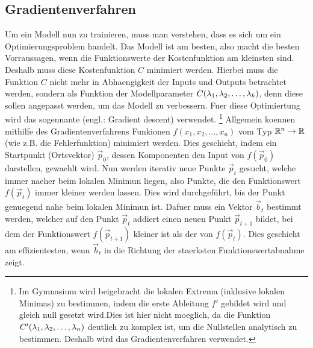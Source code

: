 \subsection{Gradientenverfahren}\label{sec:gradientenverfahren}
Um ein Modell nun zu trainieren, muss man verstehen, dass es sich um ein Optimierungsproblem handelt.
Das Modell ist am besten, also macht die besten Vorraussagen, wenn die
Funktionswerte der Kostenfunktion am kleinsten sind.
Deshalb muss diese Kostenfunktion $C$ minimiert werden.
Hierbei muss die Funktion $C$ nicht mehr in Abhaengigkeit der Inputs und Outputs betrachtet
werden, sondern als Funktion der Modellparameter
$C(\lambda_1, \lambda_2, \ldots, \lambda_k)$, denn diese sollen angepasst werden,
um das Modell zu verbessern.
Fuer diese Optimiertung wird das sogennante  (engl.: Gradient descent) verwendet.
\footnote{%
  Im Gymnasium wird beigebracht die lokalen Extrema (inklusive lokalen Minimas) zu
  bestimmen, indem die erste Ableitung $f'$ gebildet wird und gleich null gesetzt
  wird.Dies ist hier nicht moeglich, da die Funktion
  $C'(\lambda_1,\lambda_2,\ldots,\lambda_n)$ deutlich zu komplex ist, um die
  Nullstellen analytisch zu bestimmen. Deshalb wird das Gradientenverfahren
  verwendet.
}
\para{}
Allgemein koennen mithilfe des Gradientenverfahrens Funkionen $f(x_1, x_2, \ldots, x_n)$ vom Typ $\mathbb{R}^n \to \mathbb{R}$ (wie z.B. die Fehlerfunktion) minimiert werden.
Dies geschieht, indem ein Startpunkt (Ortsvektor) $\vec{p}_0$, dessen
Komponenten den Input von $f(\vec{p}_0)$ darstellen, gewaehlt wird.
Nun werden iterativ neue Punkte $\vec{p}_t$ gesucht, welche immer naeher beim lokalen Minimun liegen, also Punkte, die den Funktionswert $f(\vec{p}_t)$ immer kleiner werden lassen.
Dies wird durchgeführt, bis der Punkt genuegend nahe beim lokalen Minimun ist.
\para{}
Dafuer muss ein Vektor $\vec{b}_t$ bestimmt werden, welcher auf den Punkt $\vec{p}_t$ addiert einen neuen Punkt $\vec{p}_{t+1}$ bildet,
bei dem der Funktionswert $f(\vec{p}_{t+1})$ kleiner ist als der von $f(\vec{p}_t)$.
Dies geschieht am effizientesten, wenn $\vec{b}_t$ in die Richtung der staerksten Funktionswertabnahme zeigt.

